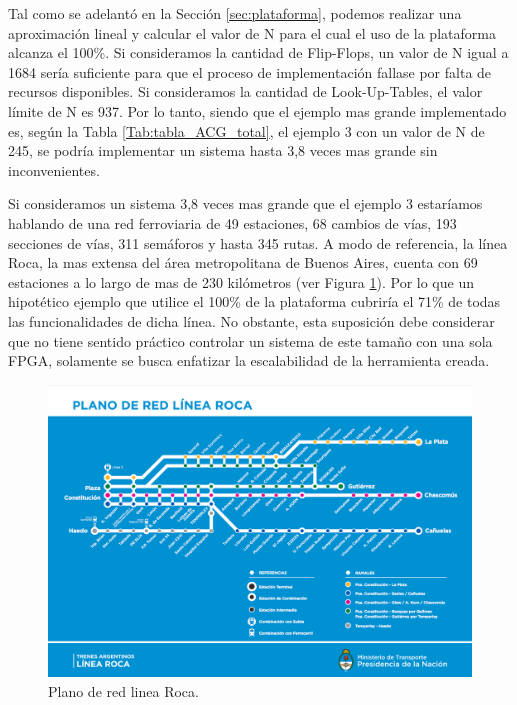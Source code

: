 	Tal como se adelantó en la Sección \ref{sec:plataforma}, podemos realizar una aproximación lineal y calcular el valor de N para el cual el uso de la plataforma alcanza el 100\%. Si consideramos la cantidad de Flip-Flops, un valor de N igual a 1684 sería suficiente para que el proceso de implementación fallase por falta de recursos disponibles. Si consideramos la cantidad de Look-Up-Tables, el valor límite de N es 937. Por lo tanto, siendo que el ejemplo mas grande implementado es, según la Tabla \ref{Tab:tabla_ACG_total}, el ejemplo 3 con un valor de N de 245, se podría implementar un sistema hasta 3,8 veces mas grande sin inconvenientes.
	
	 Si consideramos un sistema 3,8 veces mas grande que el ejemplo 3 estaríamos hablando de una red ferroviaria de 49 estaciones, 68 cambios de vías, 193 secciones de vías, 311 semáforos y hasta 345 rutas. A modo de referencia, la línea Roca, la mas extensa del área metropolitana de Buenos Aires, cuenta con 69 estaciones a lo largo de mas de 230 kilómetros \cite{TRENES} (ver Figura \ref{fig:ROCA}). Por lo que un hipotético ejemplo que utilice el 100\% de la plataforma cubriría el 71\% de todas las funcionalidades de dicha línea. No obstante, esta suposición debe considerar que no tiene sentido práctico controlar un sistema de este tamaño con una sola FPGA, solamente se busca enfatizar la escalabilidad de la herramienta creada.
	 
	 \begin{figure}[H]
	 	\centering
	 	\includegraphics[origin = c, width=1\textwidth]{resultados-obtenidos/ejemplo1/images/mapa-linea-roca}
	 	\centering\caption{Plano de red linea Roca.}
	 	\label{fig:ROCA}
	 \end{figure}
	 
